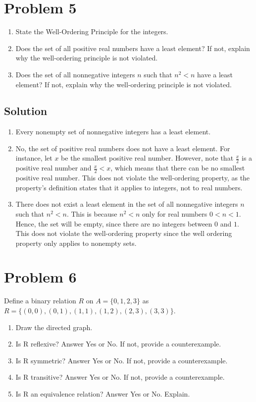 \documentclass[table]{article}
\begin{document}
\section{Problem 5}
\begin{enumerate}[nosep,label=\alph*)]
\item State the Well-Ordering Principle for the integers.
\item Does the set of all positive real numbers have a least element? If not, explain why the well-ordering principle is not violated.
\item Does the set of all nonnegative integers $n$ such that $n^2 < n$ have a least element? If not, explain why the well-ordering principle is not violated.
\end{enumerate}
\subsection{Solution}
\begin{enumerate}[nosep,label=\alph*)]
\item Every nonempty set of nonnegative integers has a least element.
\item No, the set of positive real numbers does not have a least element. For instance, let $x$ be the smallest positive real number. However, note that $\frac{x}{2}$ is a positive real number and $\frac{x}{2} < x$, which means that there can be no smallest positive real number. This does not violate the well-ordering property, as the property's definition states that it applies to integers, not to real numbers.
\item There does not exist a least element in the set of all nonnegative integers $n$ such that $n^2 < n$. This is because $n^2<n$ only for real numbers $0 < n < 1$. Hence, the set will be empty, since there are no integers between $0$ and $1$. This does not violate the well-ordering property since the well ordering property only applies to nonempty sets.
\end{enumerate}
\section{Problem 6}
Define a binary relation $R$ on $A = \{0, 1, 2, 3\}$ as $R = \{(0,0), (0,1), (1,1), (1,2), (2,3), (3,3)\}$.
\begin{enumerate}[nosep,label=\alph*)]
\item Draw the directed graph.
\item Is R reflexive? Answer Yes or No. If not, provide a counterexample.
\item Is R symmetric? Answer Yes or No. If not, provide a counterexample.
\item Is R transitive? Answer Yes or No. If not, provide a counterexample.
\item Is R an equivalence relation? Answer Yes or No. Explain.
\end{enumerate}
\end{document}
